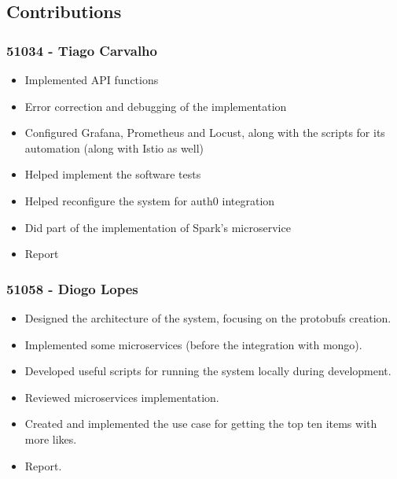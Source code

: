 \documentclass[oneside]{article}
\begin{document}
  \subsection{Contributions}
  \label{sec:contributions}

    \subsubsection{51034 - Tiago Carvalho}
    	\begin{itemize}
    		\item Implemented API functions
    		\item Error correction and debugging of the implementation
    		\item Configured Grafana, Prometheus and Locust, along with the scripts for its automation (along with Istio as well)
    		\item Helped implement the software tests
    		\item Helped reconfigure the system for auth0 integration
    		\item Did part of the implementation of Spark's microservice
            \item Report
    	\end{itemize}
    \subsubsection{51058 - Diogo Lopes}
      \begin{itemize}
        \item Designed the architecture of the system, focusing on the protobufs creation.
        \item Implemented some microservices (before the integration with mongo).
        \item Developed useful scripts for running the system locally during development.
        \item Reviewed microservices implementation.
        \item Created and implemented the use case for getting the top ten items with more likes.
        \item Report.
      \end{itemize}
\end{document}
